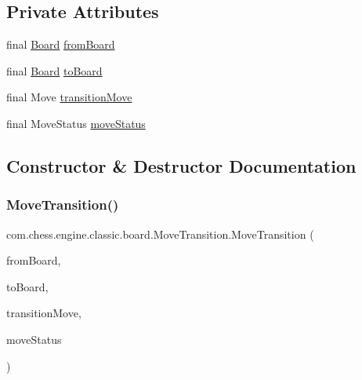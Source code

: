 \subsection*{Private Attributes}
\begin{DoxyCompactItemize}
\item 
final \mbox{\hyperlink{classcom_1_1chess_1_1engine_1_1classic_1_1board_1_1_board}{Board}} \mbox{\hyperlink{classcom_1_1chess_1_1engine_1_1classic_1_1board_1_1_move_transition_a99ec04df17243401f6e3a67b0e90c1f6}{from\+Board}}
\item 
final \mbox{\hyperlink{classcom_1_1chess_1_1engine_1_1classic_1_1board_1_1_board}{Board}} \mbox{\hyperlink{classcom_1_1chess_1_1engine_1_1classic_1_1board_1_1_move_transition_ace5ea50412538800810ba8f87d7eca83}{to\+Board}}
\item 
final Move \mbox{\hyperlink{classcom_1_1chess_1_1engine_1_1classic_1_1board_1_1_move_transition_a830cb2cf536ebd653d409a1449a22ceb}{transition\+Move}}
\item 
final Move\+Status \mbox{\hyperlink{classcom_1_1chess_1_1engine_1_1classic_1_1board_1_1_move_transition_a4bbb0266c97363274707853e336d6963}{move\+Status}}
\end{DoxyCompactItemize}


\subsection{Constructor \& Destructor Documentation}
\mbox{\label{classcom_1_1chess_1_1engine_1_1classic_1_1board_1_1_move_transition_a7391960ea30362c621ccc417b65d30a9}} 
\subsubsection{\texorpdfstring{MoveTransition()}{MoveTransition()}}
{\footnotesize\ttfamily com.\+chess.\+engine.\+classic.\+board.\+Move\+Transition.\+Move\+Transition (\begin{DoxyParamCaption}\item[{final \mbox{\hyperlink{classcom_1_1chess_1_1engine_1_1classic_1_1board_1_1_board}{Board}}}]{from\+Board,  }\item[{final \mbox{\hyperlink{classcom_1_1chess_1_1engine_1_1classic_1_1board_1_1_board}{Board}}}]{to\+Board,  }\item[{final Move}]{transition\+Move,  }\item[{final Move\+Status}]{move\+Status }\end{DoxyParamCaption})}



